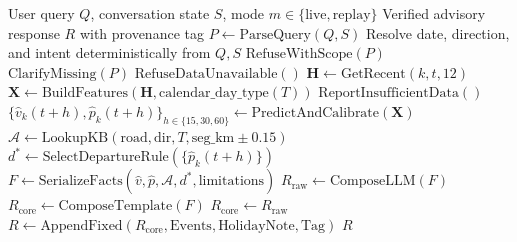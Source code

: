 \begin{algorithm}[t]
\caption{Guardrailed Congestion Prediction and Advisory Pipeline}
\label{alg:agent}
\begin{algorithmic}[1]
\Require User query $Q$, conversation state $S$, mode $m \in \{\text{live}, \text{replay}\}$
\Ensure Verified advisory response $R$ with provenance tag
\State $P \gets \text{ParseQuery}(Q, S)$ 
\State Resolve date, direction, and intent deterministically from $Q, S$
    \State \Return $\text{RefuseWithScope}(P)$
    \State \Return $\text{ClarifyMissing}(P)$
\EndIf
{}
    \State \Return $\text{RefuseDataUnavailable}()$
\EndIf
\State $\mathbf{H} \gets \text{GetRecent}(k, t, 12)$ 
\State $\mathbf{X} \gets \text{BuildFeatures}(\mathbf{H}, \text{calendar\_day\_type}(T))$
    \State \Return $\text{ReportInsufficientData}()$
\EndIf
\State $\{\hat{v}_k(t+h), \hat{p}_k(t+h)\}_{h \in \{15,30,60\}} \gets \text{PredictAndCalibrate}(\mathbf{X})$
\State $\mathcal{A} \gets \text{LookupKB}(\text{road}, \text{dir}, T, \text{seg\_km} \pm 0.15)$
\State $d^* \gets \text{SelectDepartureRule}(\{\hat{p}_k(t+h)\})$
\State $F \gets \text{SerializeFacts}(\hat{v}, \hat{p}, \mathcal{A}, d^*, \text{limitations})$
\State $R_{\text{raw}} \gets \text{ComposeLLM}(F)$
    \State $R_{\text{core}} \gets \text{ComposeTemplate}(F)$ 
\Else
    \State $R_{\text{core}} \gets R_{\text{raw}}$
\EndIf
\State $R \gets \text{AppendFixed}(R_{\text{core}}, \text{Events}, \text{HolidayNote}, \text{Tag})$
\State \Return $R$
\end{algorithmic}
\end{algorithm}
